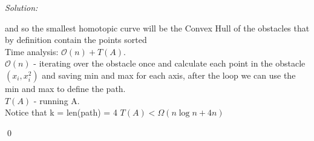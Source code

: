 \documentclass[a4paper, 8pt, oneside]{article}
\newenvironment{sol}
    {\emph{Solution:}
    }
    {
    \qed
    }
\begin{document}
\begin{enumerate}
\begin{sol}
and so the smallest homotopic curve will be the Convex Hull of the obstacles that by definition contain the points sorted \\

Time analysis: $\mathcal{O}(n) + T(A)$. \\

$\mathcal{O}(n)$  - iterating over the obstacle once and calculate each point in the obstacle $(x_i, x_i^2)$ and saving min and max for each axis, after the loop we can use the min and max to define the path.\\
$T(A)$ -  running A. \\
Notice that k = len(path) = 4 $T(A) < \Omega(n\log n + 4n)$

\end{sol}
\end{enumerate}
\end{document}
